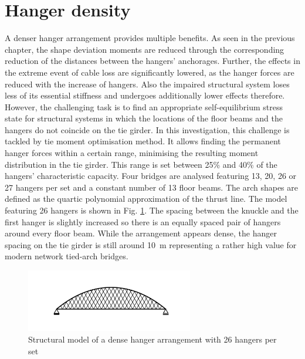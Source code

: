 \section{Hanger density}
A denser hanger arrangement provides multiple benefits. As seen in the previous chapter, the shape deviation moments are reduced through the corresponding reduction of the distances between the hangers' anchorages. Further, the effects in the extreme event of cable loss are significantly lowered, as the hanger forces are reduced with the increase of hangers. Also the impaired structural system loses less of its essential stiffness and undergoes additionally lower effects therefore. However, the challenging task is to find an appropriate self-equilibrium stress state for structural systems in which the locations of the floor beams and the hangers do not coincide on the tie girder. 
In this investigation, this challenge is tackled by tie moment optimisation method. It allows finding the permanent hanger forces within a certain range, minimising the resulting moment distribution in the tie girder. This range is set between 25\% and 40\% of the hangers' characteristic capacity.  Four bridges are analysed featuring 13, 20, 26 or 27 hangers per set and a constant number of 13 floor beams. The arch shapes are defined as the quartic polynomial approximation of the thrust line. The model featuring 26 hangers is shown in Fig. \ref{fig:structure_26}. The spacing between the knuckle and the first hanger is slightly increased so there is an equally spaced pair of hangers around every floor beam. While the arrangement appears dense, the hanger spacing on the tie girder is still around \SI{10}{m} representing a rather high value for modern network tied-arch bridges.

\begin{figure}[H]
    \centering
    \includegraphics[trim={0 1cm 0 1cm},clip, width=0.65\textwidth]{calculations/hanger amount comparison/structure_26.png}
    \caption{Structural model of a dense hanger arrangement with 26 hangers per set}
    \label{fig:structure_26}
\end{figure}


